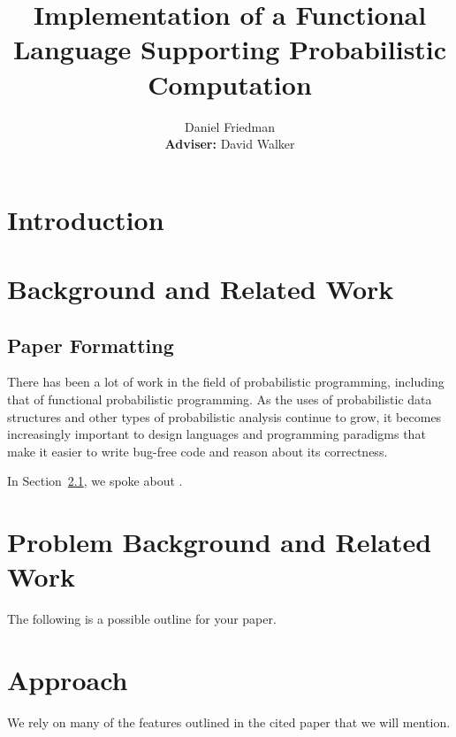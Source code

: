 \documentclass[pageno]{jpaper}
\begin{document}
\title{
  Implementation of a Functional Language Supporting Probabilistic Computation}

\author{Daniel Friedman\\\textbf{Adviser:} David Walker}

\date{}
\maketitle

\thispagestyle{empty}
\doublespacing
\begin{abstract}
\end{abstract}

\tableofcontents

\section{Introduction}

\section{Background and Related Work}

\subsection{Paper Formatting}
\label{section:formatting}

There has been a lot of work in the field of probabilistic programming, including that of functional probabilistic programming. As the uses of probabilistic data structures and other types of probabilistic analysis continue to grow, it becomes increasingly important to design languages and programming paradigms that make it easier to write bug-free code and reason about its correctness.

In Section~\ref{section:formatting}, we spoke about \cite{nicepaper,nicepaper2}.

\section{Problem Background and Related Work}
The following is a possible outline for your paper.

\section{Approach}
We rely on many of the features outlined in the cited paper that we will mention.
\end{document}
